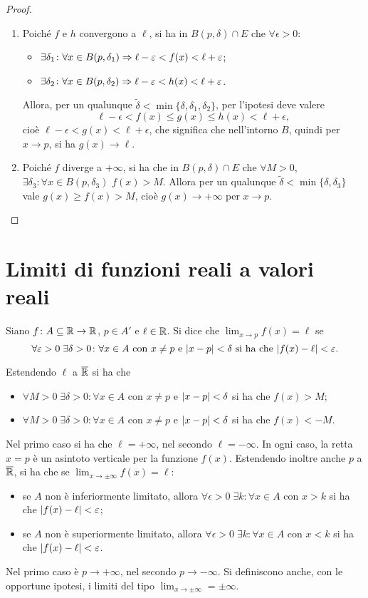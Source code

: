 \begin{proof}
\begin{enumerate}
\item Poiché $f$ e $h$ convergono a $\ell$, si ha in $B(p,\delta)\cap E$ che $\forall\epsilon>0$:
\begin{itemize}
\item $\exists\delta_1\colon\forall x\in B(p,\delta_1)\Rightarrow\ell-\varepsilon<f(x)<\ell+\varepsilon$;
\item $\exists\delta_2\colon\forall x\in B(p,\delta_2)\Rightarrow\ell-\varepsilon<h(x)<\ell+\varepsilon$.
\end{itemize}
Allora, per un qualunque $\tilde{\delta}<\min\{\delta,\delta_1,\delta_2\}$, per l'ipotesi deve valere
\[
\ell-\epsilon<f(x)\leq g(x)\leq h(x)<\ell+\epsilon,
\]
cioè $\ell-\epsilon<g(x)<\ell+\epsilon$, che significa che nell'intorno $B$, quindi per $x\to p$, si ha $g(x)\to\ell$.
\item Poiché $f$ diverge a $+\infty$, si ha che in $B(p,\delta)\cap E$ che $\forall M>0$, $\exists\delta_3\colon\forall x\in B(p,\delta_3)$ $f(x)>M$. Allora per un qualunque $\tilde{\delta}<\min\{\delta,\delta_3\}$ vale $g(x)\geq f(x)>M$, cioè $g(x)\to+\infty$ per $x\to p$.\qedhere
\end{enumerate}
\end{proof}

\section{Limiti di funzioni reali a valori reali}
\begin{definizione}
Siano $f\colon A\subseteq\mathbb{R}\to\mathbb{R}$, $p\in A'$ e $\ell\in\mathbb{R}$. Si dice che $\lim_{x\to p}f(x)=\ell$ se
\[
\forall\varepsilon>0\;\exists\delta>0\colon\forall x\in A\text{ con }x\neq p\text{ e }\lvert x-p\rvert<\delta\text{ si ha che }\lvert f(x)-\ell\rvert<\varepsilon.
\]
\end{definizione}
Estendendo $\ell$ a $\overline{\mathbb{R}}$ si ha che
\begin{itemize}
\item$\forall M>0\;\exists\delta>0\colon\forall x\in A$ con $x\neq p$ e $\lvert x-p\rvert<\delta$ si ha che $f(x)>M$;
\item$\forall M>0\;\exists\delta>0\colon\forall x\in A$ con $x\neq p$ e $\lvert x-p\rvert<\delta$ si ha che $f(x)<-M$.
\end{itemize}
Nel primo caso si ha che $\ell=+\infty$, nel secondo $\ell=-\infty$. In ogni caso, la retta $x=p$ è un asintoto verticale per la funzione $f(x)$.
Estendendo inoltre anche $p$ a $\overline{\mathbb{R}}$, si ha che se $\lim_{x\to\pm\infty}f(x)=\ell$:
\begin{itemize}
\item se $A$ non è inferiormente limitato, allora $\forall\epsilon>0\;\exists k\colon\forall x\in A$ con $x>k$ si ha che $\lvert f(x)-\ell\rvert<\varepsilon$;
\item se $A$ non è superiormente limitato, allora $\forall\epsilon>0\;\exists k\colon\forall x\in A$ con $x<k$ si ha che $\lvert f(x)-\ell\rvert<\varepsilon$.
\end{itemize}
Nel primo caso è $p\to+\infty$, nel secondo $p\to-\infty$.
Si definiscono anche, con le opportune ipotesi, i limiti del tipo $\lim_{x\to\pm\infty}=\pm\infty$.

